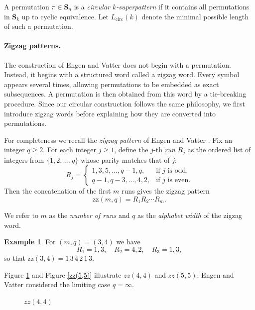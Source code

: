 \documentclass[a4paper,12pt]{article}
\theoremstyle{definition}
\newtheorem{eg}[theorem]{Example}
\numberwithin{equation}{section}
\begin{document}
A permutation $\pi \in \mathbf{S}_n$ is a \emph{circular $k$-superpattern} if it contains all permutations in $\mathbf{S}_k$ up to cyclic equivalence.  
Let $L_{\mathrm{circ}}(k)$ denote the minimal possible length of such a permutation.

\paragraph{Zigzag patterns.}
The construction of Engen and Vatter does not begin with a permutation. Instead, it begins with a structured word called a zigzag word. Every symbol appears several times, allowing permutations to be embedded as exact subsequences. A permutation is then obtained from this word by a tie-breaking procedure. Since our circular construction follows the same philosophy, we first introduce zigzag words before explaining how they are converted into permutations.

For completeness we recall the \emph{zigzag pattern} of Engen and Vatter \cite{engen2020containing}.  Fix an integer $q \ge 2$.  
For each integer $j \ge 1$, define the $j$-th \emph{run} $R_j$ as the ordered list of integers from $\{1,2,\dots,q\}$ whose parity matches that of $j$:  
\[
R_j =
\begin{cases}
1,3,5,\dots,q-1,q, & \text{if $j$ is odd},\\[3pt]
q-1,q-3,\dots,4,2, & \text{if $j$ is even}.
\end{cases}
\]
Then the concatenation of the first $m$ runs gives the zigzag pattern
\[
\mathrm{zz}(m,q) = R_1 R_2 \cdots R_m.
\]

We refer to $m$ as the \emph{number of runs} and $q$ as the \emph{alphabet width} of the zigzag word.

\begin{eg}
For $(m,q)=(3,4)$ we have
\[
R_1 = 1,3, \quad
R_2 = 4,2, \quad
R_3 = 1,3,
\]
so that $\mathrm{zz}(3,4) = 1\,3\,4\,2\,1\,3.$
\end{eg} 
Figure \ref{zz(4,4)} and Figure \ref{zz(5,5)} illustrate $zz(4,4)$ and $zz(5,5)$.
Engen and Vatter considered the limiting case $q=\infty$.
\begin{figure}[H]
    \centering
{}
    \caption{$zz(4,4)$}
    \label{zz(4,4)}
\end{figure}
\end{document}
